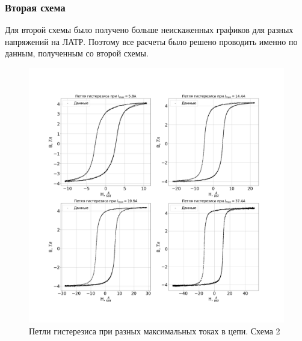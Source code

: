 \documentclass[a4paper,14pt]{extarticle}
\begin{document}
			\subsubsection{Вторая схема}
				Для второй схемы было получено больше неискаженных графиков для разных напряжений на ЛАТР. Поэтому все расчеты было решено проводить именно по данным, полученным со второй схемы.
				\begin{figure}[h]
					\centering
					\includegraphics[width=1.0\linewidth]{Lab2_3.png}
					\caption{Петли гистерезиса при разных максимальных токах в цепи. Схема 2}
					\label{fig6}
				\end{figure}
				\newpage
\end{document}
